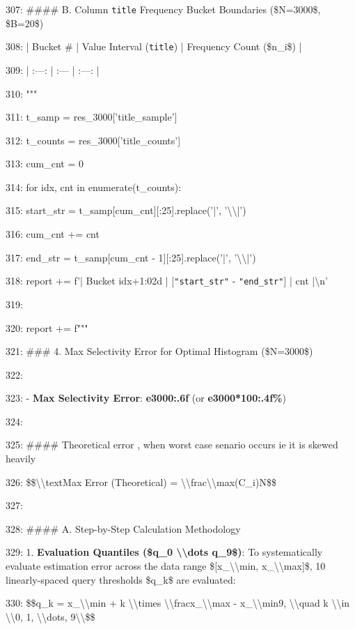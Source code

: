 \documentclass[11pt,a4paper]{article}
\begin{document}
307: \#\#\#\# B. Column \texttt{title} Frequency Bucket Boundaries (\$N=3000\$, \$B=20\$)

308: | Bucket \# | Value Interval (\texttt{title}) | Frequency Count (\$n\_i\$) |

309: | :---: | :--- | :---: |

310: """

311:     t\_samp = res\_3000['title\_sample']

312:     t\_counts = res\_3000['title\_counts']

313:     cum\_cnt = 0

314:     for idx, cnt in enumerate(t\_counts):

315:         start\_str = t\_samp[cum\_cnt][:25].replace('|', '\textbackslash{}\textbackslash{}|')

316:         cum\_cnt += cnt

317:         end\_str = t\_samp[cum\_cnt - 1][:25].replace('|', '\textbackslash{}\textbackslash{}|')

318:         report += f'| Bucket {idx+1:02d} | [\texttt{"{start\_str}"} - \texttt{"{end\_str}"}] | {cnt} |\textbackslash{}n'

319:

320:     report += f"""

321: \#\#\# 4. Max Selectivity Error for Optimal Histogram (\$N=3000\$)

322:

323: - \textbf{Max Selectivity Error}: \textbf{{e3000:.6f}} (or \textbf{{e3000*100:.4f}\%})

324:

325: \#\#\#\# Theoretical error , when worst case senario occurs ie it is skewed heavily

326: \$\$\textbackslash{}\textbackslash{}text{{Max Error (Theoretical)}} = \textbackslash{}\textbackslash{}frac{{\textbackslash{}\textbackslash{}max(C\_i)}}{{N}}\$\$

327:

328: \#\#\#\# A. Step-by-Step Calculation Methodology

329: 1. \textbf{Evaluation Quantiles (\$q\_0 \textbackslash{}\textbackslash{}dots q\_9\$)}: To systematically evaluate estimation error across the data range \$[x\_{{\textbackslash{}\textbackslash{}min}}, x\_{{\textbackslash{}\textbackslash{}max}}]\$, 10 linearly-spaced query thresholds \$q\_k\$ are evaluated:

330:    \$\$q\_k = x\_{{\textbackslash{}\textbackslash{}min}} + k \textbackslash{}\textbackslash{}times \textbackslash{}\textbackslash{}frac{{x\_{{\textbackslash{}\textbackslash{}max}} - x\_{{\textbackslash{}\textbackslash{}min}}}}{{9}}, \textbackslash{}\textbackslash{}quad k \textbackslash{}\textbackslash{}in \textbackslash{}\textbackslash{}{{0, 1, \textbackslash{}\textbackslash{}dots, 9\textbackslash{}\textbackslash{}}}\$\$
\end{document}
